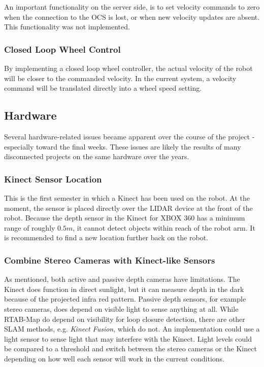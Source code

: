 An important functionality on the server side, is to set velocity commands to zero when the connection to the \ac{OCS} is lost, or when new velocity updates are absent. This functionality was not implemented.

\subsubsection{Closed Loop Wheel Control}

By implementing a closed loop wheel controller, the actual velocity of the robot will be closer to the commanded velocity. In the current system, a velocity command will be translated directly into a wheel speed setting.

\subsection{Hardware}

Several hardware-related issues became apparent over the course of the project - especially toward the final weeks. These issues are likely the results of many disconnected projects on the same hardware over the years.

\subsubsection{Kinect Sensor Location}

This is the first semester in which a Kinect has been used on the robot. At the moment, the sensor is placed directly over the \ac{LIDAR} device at the front of the robot. Because the depth sensor in the Kinect for XBOX 360 has a minimum range of roughly $0.5 m$, it cannot detect objects within reach of the robot arm. It is recommended to find a new location further back on the robot. 

\subsubsection{Combine Stereo Cameras with Kinect-like Sensors}

As mentioned, both active and passive depth cameras have limitations. The Kinect does function in direct sunlight, but it can measure depth in the dark because of the projected infra red pattern. Passive depth sensors, for example stereo cameras, does depend on visible light to sense anything at all. While RTAB-Map do depend on visibility for loop closure detection, there are  other \ac{SLAM} methods, e.g. \textit{Kinect Fusion}, which do not. An implementation could use a light sensor to sense light that may interfere with the Kinect. Light levels could be compared to a threshold and switch between the stereo cameras or the Kinect depending on how well each sensor will work in the current conditions. 

